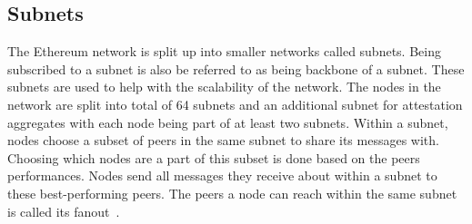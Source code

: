\subsection{Subnets}\label{subsec:subnets}
The Ethereum network is split up into smaller networks called subnets.
Being subscribed to a subnet is also be referred to as being backbone of a subnet.
These subnets are used to help with the scalability of the network.
The nodes in the network are split into total of 64 subnets and an additional subnet for attestation aggregates with each node being part of at least two subnets.
Within a subnet, nodes choose a subset of peers in the same subnet to share its messages with.
Choosing which nodes are a part of this subset is done based on the peers performances.
Nodes send all messages they receive about within a subnet to these best-performing peers.
The peers a node can reach within the same subnet is called its fanout~\cite{heimbach2024deanonymizingethereumvalidatorsp2p}.



%
%

